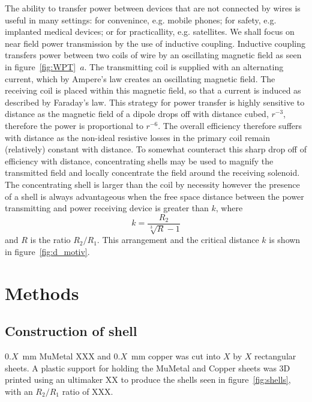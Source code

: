 \documentclass[11pt]{iopart}
\begin{document}
The ability to transfer power between devices that are not connected
by wires is useful in many settings: for convenince, e.g. mobile
phones; for safety, e.g. implanted medical devices; or for
practicallity, e.g. satellites. We shall focus on near field power
transmission by the use of inductive coupling. Inductive coupling
transfers power between two coils of wire by an oscillating magnetic
field as seen in figure~\ref{fig:WPT}~$a$. The transmitting coil is
supplied with an alternating current, which by Ampere's law creates an
oscillating magnetic field. The receiving coil is placed within this
magnetic field, so that a current is induced as described by Faraday's
law. This strategy for power transfer is highly sensitive to
distance as the magnetic field of a dipole drops off with distance
cubed, $r^{-3}$, therefore the power is proportional to
$r^{-6}$.  The overall efficiency therefore suffers with distance as
the non-ideal resistive losses in the primary coil remain (relatively)
constant with distance. To somewhat counteract this sharp drop off of
efficiency with distance, concentrating shells may be used to magnify
the transmitted field and locally concentrate the field around the
receiving solenoid. The concentrating shell is larger than the coil by necessity 
however the presence of
a shell is always advantageous when the free space distance between
the power transmitting and power receiving device is greater than $k$,
where
\begin{equation}
k = \frac{R_2}{\sqrt[3]{R}-1}
\end{equation}
and $R$ is the ratio $R_2/R_1$. This arrangement and the critical
distance $k$ is shown in figure~\ref{fig:d_motiv}.\\



\section{Methods}
\subsection{Construction of shell}
$0.X$~mm MuMetal XXX and $0.X$~mm copper was cut into $X$ by $X$ rectangular sheets. 
A plastic support for holding the MuMetal and Copper sheets was 3D printed using an ultimaker XX to produce the shells seen in figure~\ref{fig:shells}, with an $R_2/R_1$ ratio of XXX.\\
\end{document}
